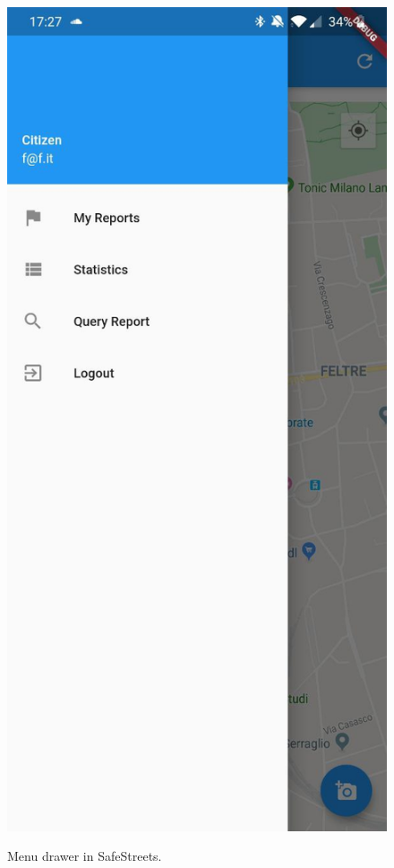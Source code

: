 \documentclass[../RASD.tex]{subfiles}
\begin{document}
    \begin{figure}[H]
        \centering
        \includegraphics[scale = 0.2]{assets/app_screenshots/menu.jpg}\\
        \caption[\textit{Menu} Screenshot]{Menu drawer in SafeStreets.}
    \end{figure}
\end{document}
